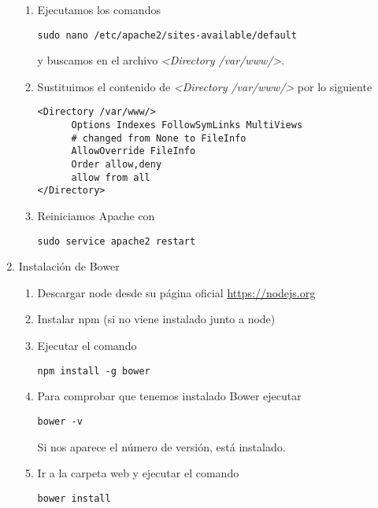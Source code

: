 \begin{enumerate}
\begin{enumerate}
\item Ejecutamos los comandos

\begin{verbatim}
sudo nano /etc/apache2/sites-available/default
\end{verbatim}

y buscamos en el archivo \emph{<Directory /var/www/>}.

\item Sustituimos el contenido de \emph{<Directory /var/www/>} por lo siguiente

\begin{verbatim}
<Directory /var/www/>
      Options Indexes FollowSymLinks MultiViews
      # changed from None to FileInfo
      AllowOverride FileInfo
      Order allow,deny
      allow from all
</Directory>
\end{verbatim}

\item Reiniciamos Apache con

\begin{verbatim}
sudo service apache2 restart
\end{verbatim}

\end{enumerate}

\item Instalación de Bower

\begin{enumerate}
\item Descargar node desde su página oficial \url{https://nodejs.org}
\item Instalar npm (si no viene instalado junto a node)
\item Ejecutar el comando 

\begin{verbatim}
npm install -g bower
\end{verbatim}

\item Para comprobar que tenemos instalado Bower ejecutar 

\begin{verbatim}
bower -v
\end{verbatim} 

Si nos aparece el número de versión, está instalado.

\item Ir a la carpeta web y ejecutar el comando 

\begin{verbatim}
bower install
\end{verbatim} 


\end{enumerate}
\end{enumerate}
